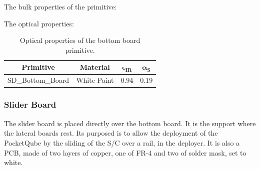 The bulk properties of the primitive:

\begin{table}[H]
    \centering
    \caption{Bulk properties of the bottom PCB.}
\end{table}

The optical properties: 

\begin{table}[H]
  \centering
  \begin{tabular}{@{}cccc@{}}
    \toprule
    \textbf{Primitive} & \textbf{Material} & $\mathbf{\epsilon_{IR}}$ & $\mathbf{\alpha_{S}}$ \\ \midrule
    SD\_Bottom\_Board  & White Paint       & 0.94                     & 0.19                  \\ \bottomrule
    \end{tabular}
  \caption{Optical properties of the bottom board primitive.}
\end{table}

\subsubsection{Slider Board}
The slider board is placed directly over the bottom board. It is the support where the lateral boards rest. Its purposed
is to allow the deployment of the PocketQube by the sliding of the S/C over a rail, in the deployer. It is also a PCB,
made of two layers of copper, one of FR-4 and two of solder mask, set to white.

